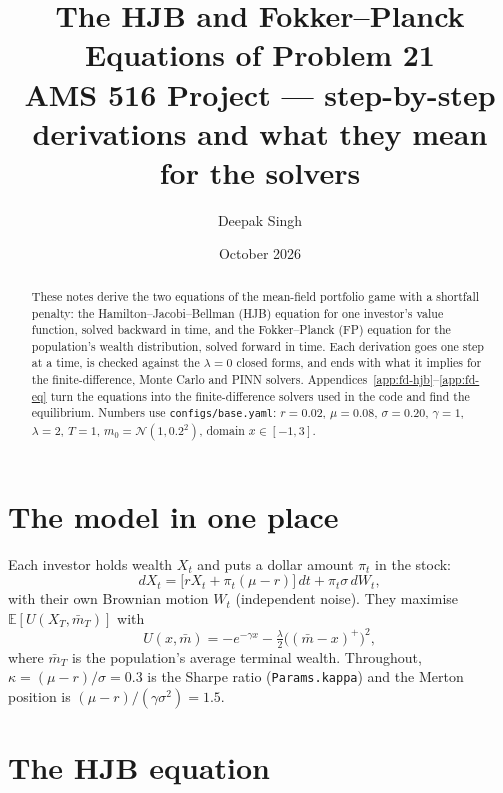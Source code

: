 \documentclass[11pt]{article}
\title{\textbf{The HJB and Fokker--Planck Equations of Problem 21}\\[4pt]
\large AMS 516 Project --- step-by-step derivations and what they mean for the solvers}
\author{Deepak Singh}
\date{October 2026}
\newcommand{\E}{\mathbb{E}}
\newcommand{\mb}{\bar m}
\begin{document}
\maketitle

\begin{abstract}
These notes derive the two equations of the mean-field portfolio game with a shortfall
penalty: the Hamilton--Jacobi--Bellman (HJB) equation for one investor's value function,
solved backward in time, and the Fokker--Planck (FP) equation for the population's wealth
distribution, solved forward in time. Each derivation goes one step at a time, is checked
against the $\lambda=0$ closed forms, and ends with what it implies for the finite-difference,
Monte Carlo and PINN solvers. Appendices~\ref{app:fd-hjb}--\ref{app:fd-eq} turn the
equations into the finite-difference solvers used in the code and find the equilibrium.
Numbers use \texttt{configs/base.yaml}:
$r=0.02$, $\mu=0.08$, $\sigma=0.20$, $\gamma=1$, $\lambda=2$, $T=1$,
$m_0=\mathcal N(1,0.2^2)$, domain $x\in[-1,3]$.
\end{abstract}

\setcounter{tocdepth}{2}
\tableofcontents

\section{The model in one place}

Each investor holds wealth $X_t$ and puts a dollar amount $\pi_t$ in the stock:
\[
  dX_t = \bigl[rX_t + \pi_t(\mu-r)\bigr]\,dt + \pi_t\sigma\,dW_t ,
\]
with their own Brownian motion $W_t$ (independent noise). They maximise
$\E[U(X_T,\mb_T)]$ with
\[
  U(x,\mb) = -e^{-\gamma x} - \tfrac{\lambda}{2}\bigl((\mb-x)^+\bigr)^2 ,
\]
where $\mb_T$ is the population's average terminal wealth. Throughout,
$\kappa=(\mu-r)/\sigma=0.3$ is the Sharpe ratio (\texttt{Params.kappa}) and the Merton
position is $(\mu-r)/(\gamma\sigma^2)=1.5$.

\section{The HJB equation}
\end{document}
